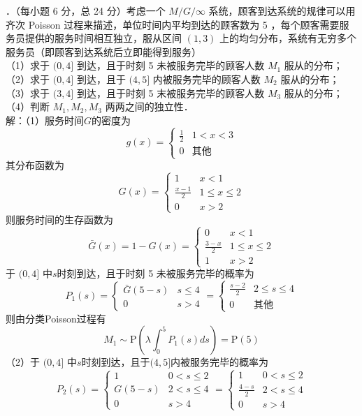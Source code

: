\documentclass[UTF8]{ctexart}
\begin{document}
．（每小题 6 分，总 24 分）考虑一个 $M / G / \infty$ 系统，顾客到达系统的规律可以用齐次 Poisson 过程来描述，单位时间内平均到达的顾客数为 5 ，每个顾客需要服务员提供的服务时间相互独立，服从区间 $(1,3)$ 上的均匀分布，系统有无穷多个服务员（即顾客到达系统后立即能得到服务）\\
（1）求于 $(0,4]$ 到达，且于时刻 5 未被服务完毕的顾客人数 $M_{1}$ 服从的分布；\\
（2）求于 $(0,4]$ 到达，且于 $(4,5]$ 内被服务完毕的顾客人数 $M_{2}$ 服从的分布；\\
（3）求于 $(3,4]$ 到达，且于时刻 5 末被服务完毕的顾客人数 $M_{3}$ 服从的分布；\\
（4）判断 $M_{1}, M_{2}, M_{3}$ 两两之间的独立性．\\
解：（1）服务时间$G$的密度为
\[
g(x)=
\begin{cases}
	\frac{1}{2}  &  1<x<3 \\
	0  &  \text{其他}
\end{cases}
\]
其分布函数为
\[
G(x)=
\begin{cases}
	1  &  x<1 \\
	\frac{x-1}{2}  &  1\le x\le 2\\
	0  &  x>2 
\end{cases}
\]
则服务时间的生存函数为
\[
\bar{G}(x)=1-G(x)=
\begin{cases}
	0  &  x<1 \\
	\frac{3-x}{2}  &  1\le x\le 2\\
	1  &  x>2 
\end{cases}
\]
于 $(0,4]$ 中$s$时刻到达，且于时刻 5 未被服务完毕的概率为
\[
P_1(s)=
\begin{cases}
	\bar{G}(5-s) &  s\le 4 \\
	0  &  s > 4
\end{cases}
=
\begin{cases}
	\frac{s-2}{2} & 2\le s\le 4 \\
	0  &  \text{其他}
\end{cases}
\]
则由分类Poisson过程有
\[
M_1 \sim \mathrm{P}\left(\lambda \int_{0}^{5} P_1(s)ds  \right) =\mathrm{P}(5)
\]
（2）于 $(0,4]$ 中$s$时刻到达，且于$(4,5]$内被服务完毕的概率为
\[
P_2(s)=
\begin{cases}
	1  &  0<s\le 2 \\
	G(5-s)  &  2<s\le 4\\
	0 & s>4
\end{cases}
=
\begin{cases}
	1  &  0<s\le 2 \\
	\frac{4-s}{2}  &  2<s\le 4\\
	0 & s>4
\end{cases}
\]
\end{document}

